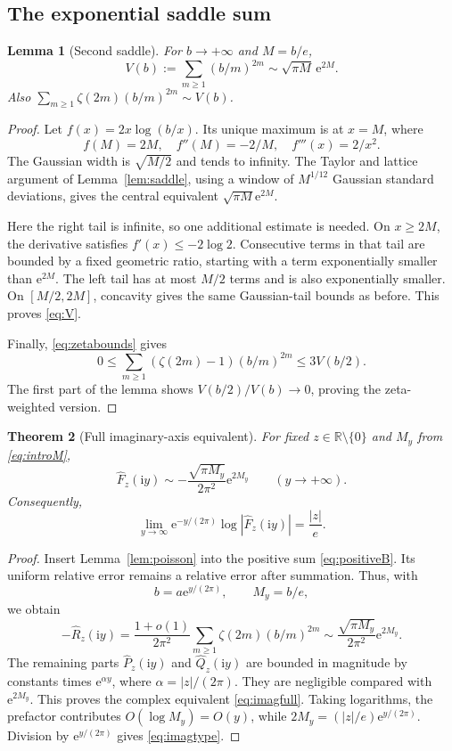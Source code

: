 \documentclass[11pt,a4paper]{article}
\numberwithin{equation}{section}
\newtheorem{theorem}{Theorem}[section]
\newtheorem{lemma}[theorem]{Lemma}
\theoremstyle{definition}
\theoremstyle{remark}
\newcommand{\R}{\mathbb R}
\newcommand{\ii}{\mathrm i}
\newcommand{\e}{\mathrm e}
\begin{document}
\subsection{The exponential saddle sum}
\begin{lemma}[Second saddle]
\label{lem:Vsaddle}
For $b\to+\infty$ and $M=b/e$,
\begin{equation}
 V(b):=\sum_{m\ge1}(b/m)^{2m}
 \sim\sqrt{\pi M}\,\e^{2M}.
 \label{eq:V}
\end{equation}
Also $\sum_{m\ge1}\zeta(2m)(b/m)^{2m}\sim V(b)$.
\end{lemma}
\begin{proof}
Let $f(x)=2x\log(b/x)$. Its unique maximum is at $x=M$, where
\[
 f(M)=2M,\quad f''(M)=-2/M,\quad f'''(x)=2/x^2.
\]
The Gaussian width is $\sqrt{M/2}$ and tends to infinity. The Taylor and lattice argument of Lemma~\ref{lem:saddle}, using a window of $M^{1/12}$ Gaussian standard deviations, gives the central equivalent $\sqrt{\pi M}\e^{2M}$.

Here the right tail is infinite, so one additional estimate is needed. On $x\ge2M$, the derivative satisfies $f'(x)\le-2\log2$. Consecutive terms in that tail are bounded by a fixed geometric ratio, starting with a term exponentially smaller than $\e^{2M}$. The left tail has at most $M/2$ terms and is also exponentially smaller. On $[M/2,2M]$, concavity gives the same Gaussian-tail bounds as before. This proves \eqref{eq:V}.

Finally, \eqref{eq:zetabounds} gives
\[
 0\le\sum_{m\ge1}(\zeta(2m)-1)(b/m)^{2m}\le3V(b/2).
\]
The first part of the lemma shows $V(b/2)/V(b)\to0$, proving the zeta-weighted version.
\end{proof}

\begin{theorem}[Full imaginary-axis equivalent]
\label{thm:imaginary}
For fixed $z\in\R\setminus\{0\}$ and $M_y$ from \eqref{eq:introM},
\begin{equation}
 \widehat F_z(\ii y)\sim
 -\frac{\sqrt{\pi M_y}}{2\pi^2}\e^{2M_y}
 \qquad(y\to+\infty).
 \label{eq:imagfull}
\end{equation}
Consequently,
\begin{equation}
 \lim_{y\to\infty}\e^{-y/(2\pi)}\log|\widehat F_z(\ii y)|
 =\frac{|z|}{e}.
 \label{eq:imagtype}
\end{equation}
\end{theorem}
\begin{proof}
Insert Lemma~\ref{lem:poisson} into the positive sum \eqref{eq:positiveB}. Its uniform relative error remains a relative error after summation. Thus, with
\[
 b=a\e^{y/(2\pi)},\qquad M_y=b/e,
\]
we obtain
\[
 -\widehat R_z(\ii y)
 =\frac{1+o(1)}{2\pi^2}\sum_{m\ge1}\zeta(2m)(b/m)^{2m}
 \sim\frac{\sqrt{\pi M_y}}{2\pi^2}\e^{2M_y}.
\]
The remaining parts $\widehat P_z(\ii y)$ and $\widehat Q_z(\ii y)$ are bounded in magnitude by constants times $\e^{\alpha y}$, where $\alpha=|z|/(2\pi)$. They are negligible compared with $\e^{2M_y}$. This proves the complex equivalent \eqref{eq:imagfull}. Taking logarithms, the prefactor contributes $O(\log M_y)=O(y)$, while $2M_y=(|z|/e)\e^{y/(2\pi)}$. Division by $\e^{y/(2\pi)}$ gives \eqref{eq:imagtype}.
\end{proof}
\end{document}
